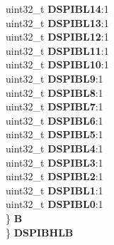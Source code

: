 \begin{DoxyCompactItemize}
\begin{tabbing}
\>\>uint32\_t {\bfseries DSPIBL14}:1\\
\>\>uint32\_t {\bfseries DSPIBL13}:1\\
\>\>uint32\_t {\bfseries DSPIBL12}:1\\
\>\>uint32\_t {\bfseries DSPIBL11}:1\\
\>\>uint32\_t {\bfseries DSPIBL10}:1\\
\>\>uint32\_t {\bfseries DSPIBL9}:1\\
\>\>uint32\_t {\bfseries DSPIBL8}:1\\
\>\>uint32\_t {\bfseries DSPIBL7}:1\\
\>\>uint32\_t {\bfseries DSPIBL6}:1\\
\>\>uint32\_t {\bfseries DSPIBL5}:1\\
\>\>uint32\_t {\bfseries DSPIBL4}:1\\
\>\>uint32\_t {\bfseries DSPIBL3}:1\\
\>\>uint32\_t {\bfseries DSPIBL2}:1\\
\>\>uint32\_t {\bfseries DSPIBL1}:1\\
\>\>uint32\_t {\bfseries DSPIBL0}:1\\
\>\} {\bfseries B}\\
\} {\bfseries DSPIBHLB}\\


\end{tabbing}
\end{DoxyCompactItemize}
